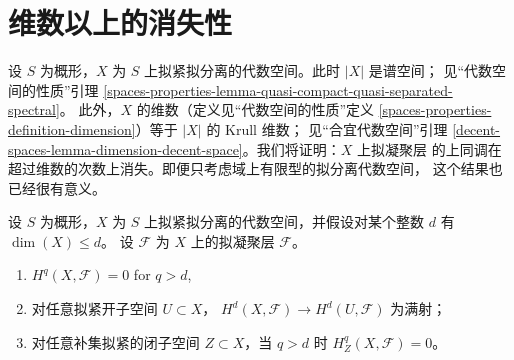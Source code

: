 \section{维数以上的消失性}
\label{section-vanishing-above-dimension}

\noindent
设 $S$ 为概形，$X$ 为 $S$ 上拟紧拟分离的代数空间。此时 $|X|$ 是谱空间；
见“代数空间的性质”引理
\ref{spaces-properties-lemma-quasi-compact-quasi-separated-spectral}。
此外，$X$ 的维数（定义见“代数空间的性质”定义
\ref{spaces-properties-definition-dimension}）等于 $|X|$ 的 Krull 维数；
见“合宜代数空间”引理
\ref{decent-spaces-lemma-dimension-decent-space}。我们将证明：$X$ 上拟凝聚层
的上同调在超过维数的次数上消失。即便只考虑域上有限型的拟分离代数空间，
这个结果也已经很有意义。

\begin{lemma}
\label{lemma-vanishing-above-dimension}
设 $S$ 为概形，$X$ 为 $S$ 上拟紧拟分离的代数空间，并假设对某个整数 $d$ 有
$\dim(X) \leq d$。
设 $\mathcal{F}$ 为 $X$ 上的拟凝聚层 $\mathcal{F}$。
\begin{enumerate}
\item $H^q(X, \mathcal{F}) = 0$ for $q > d$,
\item 对任意拟紧开子空间 $U \subset X$，
$H^d(X, \mathcal{F}) \to H^d(U, \mathcal{F})$ 为满射；
\item 对任意补集拟紧的闭子空间 $Z \subset X$，当 $q > d$ 时
$H^q_Z(X, \mathcal{F}) = 0$。
\end{enumerate}
\end{lemma}

